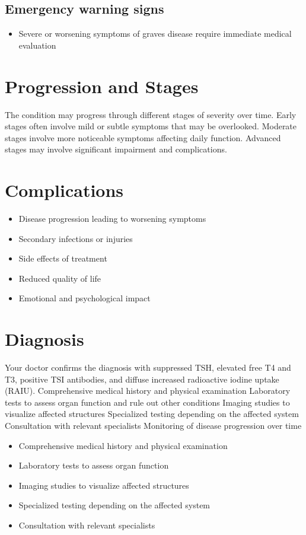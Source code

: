 \subsection{Emergency warning signs}
\begin{itemize}[noitemsep]
  \item Severe or worsening symptoms of graves disease require immediate medical evaluation
\end{itemize}
\section{Progression and Stages}
The condition may progress through different stages of severity over time. Early stages often involve mild or subtle symptoms that may be overlooked. Moderate stages involve more noticeable symptoms affecting daily function. Advanced stages may involve significant impairment and complications.
\section{Complications}
\begin{itemize}[noitemsep]
  \item Disease progression leading to worsening symptoms
  \item Secondary infections or injuries
  \item Side effects of treatment
  \item Reduced quality of life
  \item Emotional and psychological impact
\end{itemize}
\section{Diagnosis}
Your doctor confirms the diagnosis with suppressed TSH, elevated free T4 and T3, positive TSI antibodies, and diffuse increased radioactive iodine uptake (RAIU). Comprehensive medical history and physical examination Laboratory tests to assess organ function and rule out other conditions Imaging studies to visualize affected structures Specialized testing depending on the affected system Consultation with relevant specialists Monitoring of disease progression over time

\begin{itemize}[noitemsep]
  \item Comprehensive medical history and physical examination
  \item Laboratory tests to assess organ function
  \item Imaging studies to visualize affected structures
  \item Specialized testing depending on the affected system
  \item Consultation with relevant specialists
\end{itemize}
